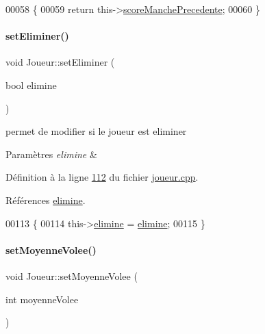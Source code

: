 \begin{DoxyCode}
00058 \{
00059     \textcolor{keywordflow}{return} this->\hyperlink{class_joueur_ac78f2e83781d2bdeb9a613dc37812736}{scoreManchePrecedente};
00060 \}
\end{DoxyCode}
\mbox{\label{class_joueur_a41dd9db4a09cd689183cc104dd1e268b}} 
\paragraph{\texorpdfstring{set\+Eliminer()}{setEliminer()}}
{\footnotesize\ttfamily void Joueur\+::set\+Eliminer (\begin{DoxyParamCaption}\item[{bool}]{elimine }\end{DoxyParamCaption})}



permet de modifier si le joueur est eliminer 


\begin{DoxyParams}{Paramètres}
{\em elimine} & \\
\hline
\end{DoxyParams}


Définition à la ligne \hyperlink{joueur_8cpp_source_l00112}{112} du fichier \hyperlink{joueur_8cpp_source}{joueur.\+cpp}.



Références \hyperlink{joueur_8h_source_l00047}{elimine}.


\begin{DoxyCode}
00113 \{
00114     this->\hyperlink{class_joueur_acac733012102f81d05b0a4c0801fcf61}{elimine} = \hyperlink{class_joueur_acac733012102f81d05b0a4c0801fcf61}{elimine};
00115 \}
\end{DoxyCode}
\mbox{\label{class_joueur_ab3cbde2b9f1662d47cbf4d892b11c933}} 
\paragraph{\texorpdfstring{set\+Moyenne\+Volee()}{setMoyenneVolee()}}
{\footnotesize\ttfamily void Joueur\+::set\+Moyenne\+Volee (\begin{DoxyParamCaption}\item[{int}]{moyenne\+Volee }\end{DoxyParamCaption})}



